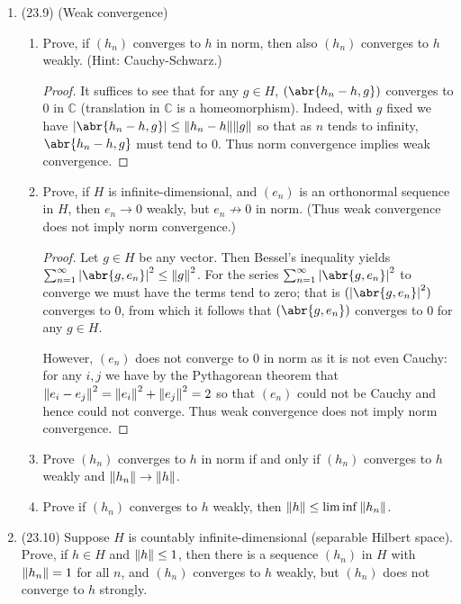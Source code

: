 \documentclass[11pt]{article}
\DeclareMathOperator{\im}{im}
\begin{document}
\begin{enumerate}
\begin{enumerate}
\begin{proof}
        Let $y\in \overline{\im T}$ with $(y_n = Tx_n)$ converging to $y$. Then for any $z\in \ker T^\ast$, by the continuity of the inner product the sequence $(\abr{Tx_n,z} = \abr{x_n,T^\ast z} = 0)$ converges to $\abr{y,z}$. Hence $\abr{y,z} =0$ so that $y\in (\ker T^\ast)^\perp$. Conversely, %
        \textcolor{red}{INCOMPLETE}
      \end{proof} 
    \end{enumerate}
    \item (23.9) (Weak convergence) \begin{enumerate}
      \item Prove, if $(h_n)$ converges to $h$ in norm, then also $(h_n)$ converges to $h$ weakly. (Hint: Cauchy-Schwarz.) \begin{proof}
        It suffices to see that for any $g\in H$, $(\abr{h_n-h,g})$ converges to $0$ in $\mathbb{C}$ (translation in $\mathbb{C}$ is a homeomorphism). Indeed, with $g$ fixed we have $\abs{\abr{h_n-h,g}}\leq \norm{h_n-h}\norm{g}$ so that as $n$ tends to infinity, $\abr{h_n-h,g}$ must tend to $0$. Thus norm convergence implies weak convergence.
      \end{proof}
      \item Prove, if $H$ is infinite-dimensional, and $(e_n)$ is an orthonormal sequence in $H$, then $e_n\to 0$ weakly, but $e_n\not\to 0$ in norm. (Thus weak convergence does not imply norm convergence.) \begin{proof}
        Let $g\in H$ be any vector. Then Bessel's inequality yields $\sum_{n=1}^\infty\abs{\abr{g,e_n}}^2\leq \norm{g}^2$. For the series $\sum_{n=1}^\infty\abs{\abr{g,e_n}}^2$ to converge we must have the terms tend to zero; that is $(\abs{\abr{g,e_n}}^2)$ converges to $0$, from which it follows that $(\abr{g,e_n})$ converges to $0$ for any $g\in H$.

        However, $(e_n)$ does not converge to $0$ in norm as it is not even Cauchy: for any $i,j$ we have by the Pythagorean theorem that $\norm{e_i-e_j}^2 = \norm{e_i}^2 + \norm{e_j}^2 = 2$ so that $(e_n)$ could not be Cauchy and hence could not converge. Thus weak convergence does not imply norm convergence. 
      \end{proof}
      \item Prove $(h_n)$ converges to $h$ in norm if and only if $(h_n)$ converges to $h$ weakly and $\norm{h_n}\to \norm{h}$.
      \item Prove if $(h_n)$ converges to $h$ weakly, then $\norm{h}\leq \liminf\norm{h_n}$.
    \end{enumerate}
    \item (23.10) Suppose $H$ is countably infinite-dimensional (separable Hilbert space). Prove, if $h\in H$ and $\norm{h}\leq 1$, then there is a sequence $(h_n)$ in $H$ with $\norm{h_n}=1$ for all $n$, and $(h_n)$ converges to $h$ weakly, but $(h_n)$ does not converge to $h$ strongly.
\end{enumerate}
\end{document}

